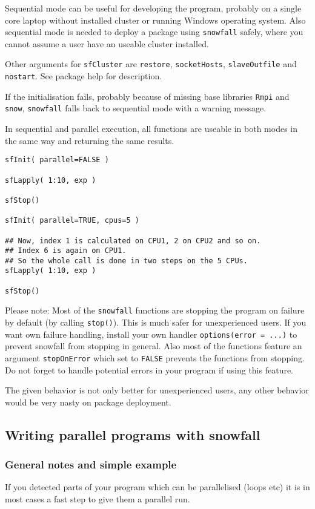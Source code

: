 \documentclass[10pt,oneside]{article}
\begin{document}
Sequential mode can be useful for developing the program, probably
on a single core laptop without installed cluster or running Windows
operating system. Also sequential mode is needed to deploy a package
using \texttt{snowfall} safely,
where you cannot assume a user have an useable cluster installed.

Other arguments for \texttt{sfCluster} are \texttt{restore}, \texttt{socketHosts},
\texttt{slaveOutfile} and \texttt{nostart}. See package help for
description.

If the initialisation fails, probably because of missing base libraries
\texttt{Rmpi} and \texttt{snow},
\texttt{snowfall} falls back to sequential mode with a warning message.

In sequential and parallel execution, 
all functions are useable in both modes in the same way and returning
the same results.

\begin{verbatim}
sfInit( parallel=FALSE )

sfLapply( 1:10, exp )

sfStop()

sfInit( parallel=TRUE, cpus=5 )

## Now, index 1 is calculated on CPU1, 2 on CPU2 and so on.
## Index 6 is again on CPU1.
## So the whole call is done in two steps on the 5 CPUs.
sfLapply( 1:10, exp )

sfStop()
\end{verbatim}

Please note: Most of the \texttt{snowfall} functions are stopping
the program on failure by default (by calling
\texttt{stop()}). This is much safer for unexperienced users. If you
want own failure handling, install your own handler
\texttt{options(error = ...)} to prevent snowfall from stopping in
general. Also most of the functions feature an argument \texttt{stopOnError}
which set to \texttt{FALSE} prevents the functions from stopping.
Do not forget to handle potential errors in your program if using this
feature.

The given behavior is not only better for unexperienced users, any other
behavior would be very nasty on package deployment.

\subsection{Writing parallel programs with snowfall}
\subsubsection{General notes and simple example}
If you detected parts of your program which can be parallelised (loops
etc) it is in most cases a fast step to give them a parallel run.
\end{document}
